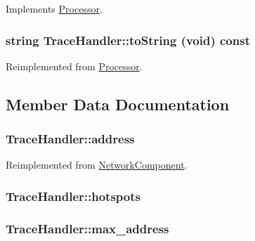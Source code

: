 Implements \hyperlink{classProcessor_495fad01358e2d9760c526d6e2db53ea}{Processor}.\hypertarget{classTraceHandler_e2a56abded1637aba10677483fee4e32}{
\subsubsection[{toString}]{\setlength{\rightskip}{0pt plus 5cm}string TraceHandler::toString (void) const}}
\label{classTraceHandler_e2a56abded1637aba10677483fee4e32}




Reimplemented from \hyperlink{classProcessor_d3bdbedfbb00b05f61504e411a418106}{Processor}.

\subsection{Member Data Documentation}
\hypertarget{classTraceHandler_ea33725c91bfe1fa432e76eade7712ed}{
\subsubsection[{address}]{ {\bf TraceHandler::address}}}
\label{classTraceHandler_ea33725c91bfe1fa432e76eade7712ed}




Reimplemented from \hyperlink{classNetworkComponent_0428749bde908497630b506071d52191}{NetworkComponent}.\hypertarget{classTraceHandler_43e0f60dfc44c9ab35598ddcfdda71a4}{
\subsubsection[{hotspots}]{ {\bf TraceHandler::hotspots}}}
\label{classTraceHandler_43e0f60dfc44c9ab35598ddcfdda71a4}


\hypertarget{classTraceHandler_0e4320c5937dc70f0fc5c636945cdd7a}{
\subsubsection[{max\_\-address}]{ {\bf TraceHandler::max\_\-address}}}
\label{classTraceHandler_0e4320c5937dc70f0fc5c636945cdd7a}


